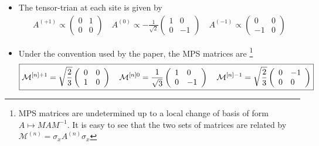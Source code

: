 \documentclass[aspectratio=169,xcolor=dvipsnames, t]{beamer}
\begin{document}
\begin{frame}
\begin{itemize}
    \item The tensor-trian at each site is given by 
    \begin{align*}
        A^{(+1)} \propto \begin{pmatrix}
            0 & 1 \\
            0 & 0
        \end{pmatrix}\quad A^{(0)} \propto -\frac{1}{\sqrt 2}\begin{pmatrix}
            1 & 0 \\
            0 & -1
        \end{pmatrix} \quad A^{(-1)}\propto \begin{pmatrix}
            0 & 0 \\
            -1 & 0
        \end{pmatrix}
    \end{align*}
    \item Under the convention used by the paper, the MPS matrices are \footnote{MPS matrices are undetermined up to a local change of basis of form $A \mapsto M A M^{-1}$. It is easy to see that the two sets of matrices are related by $\mathcal M^{(n)}=\sigma_x A^{(n)} \sigma_x$}
    \begin{align*}
        \boxed{{\cal M}^{[n]+1}=\sqrt{\frac{2}{3}}\left(\begin{array}{l l}{{0}}&{{0}}\\ {{1}}&{{0}}\end{array}\right)\quad {\cal M}^{[n]0}=\frac{1}{\sqrt{3}}\left(\begin{array}{l l}{{1}}&{{0}}\\ {{0}}&{{-1}}\end{array}\right) \quad {\cal M}^{[n]-1}=\sqrt{\frac{2}{3}}\left(\begin{array}{l l}{{0}}&{{-1}}\\ {{0}}&{{0}}\end{array}\right)}
    \end{align*}
\end{itemize}
\end{frame}
\end{document}
